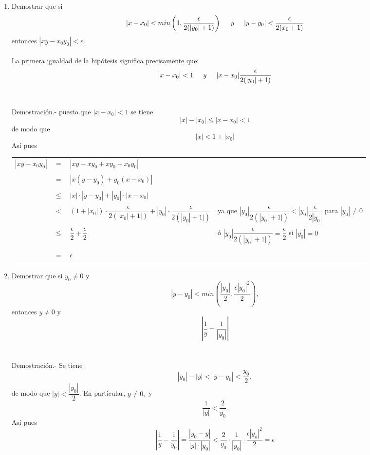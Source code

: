 \begin{enumerate}[\bfseries 1.]
\item Demostrar que si $$|x-x_0|< min \left( 1,\dfrac{\epsilon}{2(|y_0|+1)} \right) \hspace{0.5cm} y \hspace{0.5cm} |y-y_0|< \dfrac{\epsilon}{2(x_0+1)}$$ entonces $|xy - x_0 y_0 |< \epsilon.$\\\\
La primera igualdad de la hipótesis significa precisamente que: $$|x-x_0|<1 \hspace{0.5cm} y \hspace{0.5cm} |x - x_0| \dfrac{\epsilon}{2(|y_0|+1)}$$\\\\
Demostración.- \; puesto que $|x-x_0| < 1$ se tiene $$|x|-|x_0| \leq |x-x_0| < 1$$ de modo que $$|x| < 1 + |x_0|$$ Así pues 
\begin{center}
\begin{tabular}{r c l l}
$|xy - x_0 y_0|$&=&$| xy -xy_0 + xy_0 -x_0 y_0 |$&\\\\
&=&$|x(y - y_0) + y_0(x - x_0)|$&\\\\
&$\leq$&$|x| \cdot |y - y_0| + |y_0| \cdot |x - x_0|$&\\\\
&$<$&$(1+|x_0|) \cdot \dfrac{\epsilon}{2(|x_0|+1|)} +  |y_0| \cdot \dfrac{\epsilon}{2(|y_0|+1|)}$&ya que $ |y_0|\dfrac{\epsilon}{2(|y_0|+ 1|)} < |y_0| \dfrac{\epsilon}{2|y_0|}$ para $|y_0|\neq 0$\\\\
&$\leq$&$\dfrac{\epsilon}{2} + \dfrac{\epsilon}{2}$& ó $|y_0|\dfrac{\epsilon}{2(|y_0|+ 1|)} = \dfrac{\epsilon}{2}$ si $|y_0|=0$ \\\\
&$=$&$\epsilon$&\\\\
\end{tabular}
\end{center}

\item Demostrar que si $y_0 \neq 0$ y $$|y - y_0|< min\left( \dfrac{|y_0|}{2}, \dfrac{\epsilon |y_0|^2}{2} \right),$$ 
entonces $y \neq 0$ y $$\left| \dfrac{1}{y} - \dfrac{1}{|y_0|} \right|$$\\\\
Demostración.- \; Se tiene $$|y_0| - |y| < |y - y_0| < \dfrac{y_0}{2},$$ de modo que $|y|<\dfrac{|y_0|}{2}$. En particular, $y \neq 0,$ y $$\dfrac{1}{|y|} < \dfrac{2}{y_0}.$$ Así pues $$\left| \dfrac{1}{y} - \dfrac{1}{y_0} \right| = \dfrac{|y_0 - y|}{|y| \cdot |y_0|} < \dfrac{2}{y_0} \cdot \dfrac{1}{|y_0|} \cdot \dfrac{\epsilon |y_o|^2}{2} = \epsilon$$\\\\


\end{enumerate}

